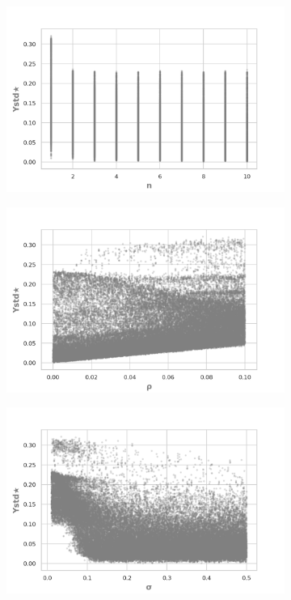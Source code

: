 \documentclass{article}
\begin{document}
        \begin{figure}[H]
  \centering
  
    \begin{subfigure}[b]{0.45\textwidth}
      \includegraphics[width=\textwidth]{img/regressionYstd*n.png}
    \end{subfigure}
    \begin{subfigure}[b]{0.45\textwidth}
      \includegraphics[width=\textwidth]{img/regressionYstd*rho.png}
     \end{subfigure}
     \begin{subfigure}[b]{0.5\textwidth}
       \includegraphics[width=\textwidth]{img/regressionYstd*sigma.png}

\end{subfigure}
\end{figure}
\end{document}
